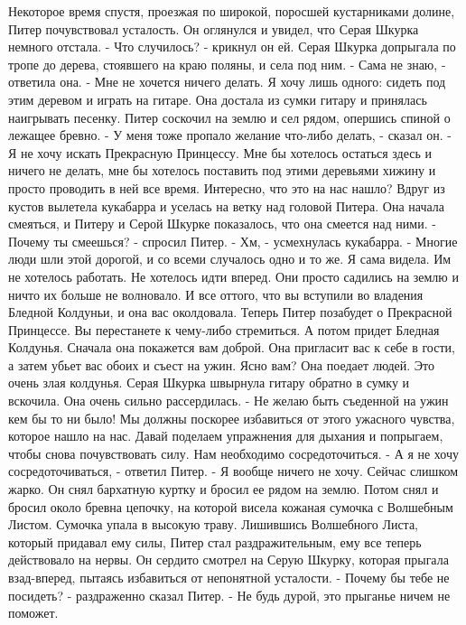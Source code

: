     Некоторое время спустя, проезжая по широкой, поросшей кустарниками 
долине, Питер почувствовал усталость. Он оглянулся и увидел, что Серая 
Шкурка немного отстала.
    - Что случилось? - крикнул он ей.
    Серая Шкурка допрыгала по тропе до дерева, стоявшего на краю 
поляны, и села под ним.
    - Сама не знаю, - ответила она. - Мне не хочется ничего делать. Я 
хочу лишь одного: сидеть под этим деревом и играть на гитаре.
    Она достала из сумки гитару и принялась наигрывать песенку. Питер 
соскочил на землю и сел рядом, опершись спиной о лежащее бревно.
    - У меня тоже пропало желание что-либо делать, - сказал он. - Я не 
хочу искать Прекрасную Принцессу. Мне бы хотелось остаться здесь и 
ничего не делать, мне бы хотелось поставить под этими деревьями хижину 
и просто проводить в ней все время. Интересно, что это на нас нашло?
    Вдруг из кустов вылетела кукабарра и уселась на ветку над головой 
Питера. Она начала смеяться, и Питеру и Серой Шкурке показалось, что 
она смеется над ними.
    - Почему ты смеешься? - спросил Питер.
    - Хм, - усмехнулась кукабарра. - Многие люди шли этой дорогой, и 
со всеми случалось одно и то же. Я сама видела. Им не хотелось 
работать. Не хотелось идти вперед. Они просто садились на землю и 
ничто их больше не волновало. И все оттого, что вы вступили во 
владения Бледной Колдуньи, и она вас околдовала. Теперь Питер 
позабудет о Прекрасной Принцессе. Вы перестанете к чему-либо 
стремиться. А потом придет Бледная Колдунья. Сначала она покажется вам 
доброй. Она пригласит вас к себе в гости, а затем убьет вас обоих и 
съест на ужин. Ясно вам? Она поедает людей. Это очень злая колдунья.
    Серая Шкурка швырнула гитару обратно в сумку и вскочила. Она очень 
сильно рассердилась.
    - Не желаю быть съеденной на ужин кем бы то ни было! Мы должны 
поскорее избавиться от этого ужасного чувства, которое нашло на нас. 
Давай поделаем упражнения для дыхания и попрыгаем, чтобы снова 
почувствовать силу. Нам необходимо сосредоточиться.
    - А я не хочу сосредоточиваться, - ответил Питер. - Я вообще 
ничего не хочу. Сейчас слишком жарко.
    Он снял бархатную куртку и бросил ее рядом на землю. Потом снял и 
бросил около бревна цепочку, на которой висела кожаная сумочка с 
Волшебным Листом. Сумочка упала в высокую траву.
    Лишившись Волшебного Листа, который придавал ему силы, Питер стал 
раздражительным, ему все теперь действовало на нервы. Он сердито 
смотрел на Серую Шкурку, которая прыгала взад-вперед, пытаясь 
избавиться от непонятной усталости.
    - Почему бы тебе не посидеть? - раздраженно сказал Питер. - Не 
будь дурой, это прыганье ничем не поможет.
